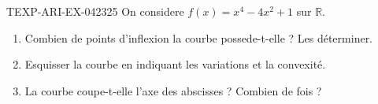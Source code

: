\begin{exercice}{TEXP-ARI-EX-042}{3}{25}
On considere $f(x) = x^4 - 4x^2 + 1$ sur $\mathbb{R}$.
\begin{enumerate}
  \item Combien de points d'inflexion la courbe possede-t-elle ? Les déterminer.
  \item Esquisser la courbe en indiquant les variations et la convexité.
  \item La courbe coupe-t-elle l'axe des abscisses ? Combien de fois ?
\end{enumerate}

\end{exercice}
